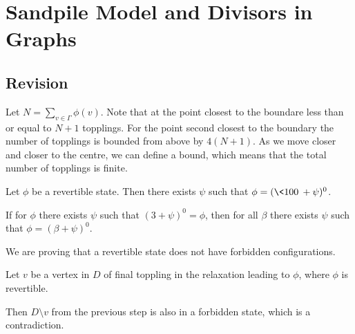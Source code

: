 \documentclass[11pt]{scrartcl}
\begin{document}
  \section{Sandpile Model and Divisors in Graphs}
  \subsection{Revision}
  \begin{soln}[1]
    \hfill

    Let $N = \sum_{v \in \Gamma} \phi(v)$. Note that at the point
    closest to the boundare less than or equal to $N+1$ topplings. For
    the point second closest to the boundary the number of topplings
    is bounded from above by $4(N+1)$. As we move closer and closer to
    the centre, we can define a bound, which means that the total
    number of topplings is finite.

  \end{soln}



  \begin{exercise}

    Let $\phi$ be a revertible state. Then there exists $\psi$ such
    that $\phi = (\< 100 \> + \psi)^{0}$.

  \end{exercise}
  \begin{exercise}

    If for $\phi$ there exists $\psi$ such that
    $(3+ \psi)^{0} = \phi$, then for all $\beta$ there exists $\psi$
    such that $\phi = (\beta + \psi)^{0}$.

  \end{exercise}
  \begin{soln}[4]
    \hfill

    We are proving that a revertible state does not have forbidden
    configurations.

    Let $v$ be a vertex in $D$ of final toppling in the relaxation
    leading to $\phi$, where $\phi$ is revertible.

    Then $D\setminus v$ from the previous step is also in a forbidden
    state, which is a contradiction.

  \end{soln}
\end{document}
